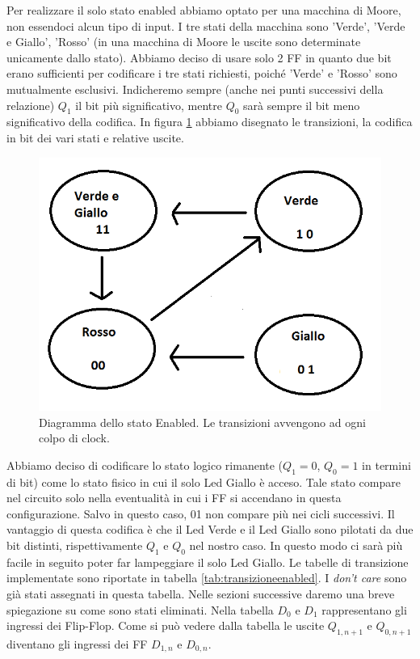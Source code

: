 \documentclass[10pt,a4paper]{article}
\begin{document}
Per realizzare il solo stato enabled abbiamo optato per una macchina di Moore, non essendoci alcun tipo di input. I tre stati della macchina sono 'Verde', 'Verde e Giallo', 'Rosso' (in una macchina di Moore le uscite sono determinate unicamente dallo stato). Abbiamo deciso di usare solo 2 FF in quanto due bit erano sufficienti per codificare i tre stati richiesti, poiché 'Verde' e 'Rosso' sono mutualmente esclusivi. Indicheremo sempre (anche nei punti successivi della relazione) $Q_1$ il bit più significativo, mentre $Q_0$ sarà sempre il bit meno significativo della codifica. In figura \ref{fig:FSMenabled} abbiamo disegnato le transizioni, la codifica in bit dei vari stati e relative uscite.
\begin{figure}[!htb]
\centering
\includegraphics[scale=0.7]{FSMenabled.png}
\caption{Diagramma dello stato Enabled. Le transizioni avvengono ad ogni colpo di clock.\label{fig:FSMenabled}}
\end{figure}
Abbiamo deciso di codificare lo stato logico rimanente ($Q_1 = 0$, $Q_0 = 1$ in termini di bit) come lo stato fisico in cui il solo Led Giallo è acceso. Tale stato compare nel circuito solo nella eventualità in cui i FF si accendano in questa configurazione. Salvo in questo caso, 01 non compare più nei cicli successivi.
Il vantaggio di questa codifica è che il Led Verde e il Led Giallo sono pilotati da due bit distinti, rispettivamente $Q_1$ e $Q_0$ nel nostro caso. In questo modo ci sarà più facile in seguito poter far lampeggiare il solo Led Giallo.
Le tabelle di transizione implementate sono riportate in tabella \ref{tab:transizioneenabled}. I \emph{don't care} sono già stati assegnati in questa tabella. Nelle sezioni successive daremo una breve spiegazione su come sono stati eliminati. Nella tabella $D_0$ e $D_1$ rappresentano gli ingressi dei Flip-Flop. Come si può vedere dalla tabella le uscite $Q_{1,n+1}$ e $Q_{0,n+1}$ diventano gli ingressi dei FF $D_{1, n}$ e $D_{0, n}$.
\end{document}
